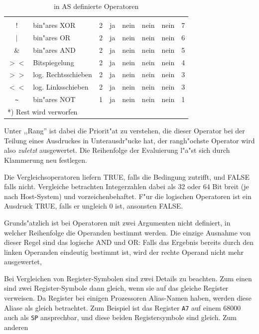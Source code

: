 \documentclass[12pt,a4paper,twoside]{report}
\newcommand{\ii}[1]{{\it #1}}
\newcommand{\asname}{AS}
\begin{document}
\begin{table}[htbp]
\begin{center}
\begin{tabular}{|c|l|c|c|c|c|c|c|}
            & & & & & &  \\
$!$         & bin"ares XOR         & 2 & ja   & nein & nein & nein & 7 \\
$|$         & bin"ares OR          & 2 & ja   & nein & nein & nein & 6 \\
\&          & bin"ares AND         & 2 & ja   & nein & nein & nein & 5 \\
$><$        & Bitspiegelung        & 2 & ja   & nein & nein & nein & 4 \\
$>>$        & log. Rechtsschieben  & 2 & ja   & nein & nein & nein & 3 \\
$<<$        & log. Linksschieben   & 2 & ja   & nein & nein & nein & 3 \\
\verb! ~ !  & bin"ares NOT         & 1 & ja   & nein & nein & nein & 1 \\
\hline
\multicolumn{8}{|l|}{*) Rest wird verworfen} \\
\hline
\end{tabular}\end{center}
\caption{in \asname{} definierte Operatoren\label{TabOps}}
\end{table}
Unter ,,Rang'' ist dabei die Priorit"at zu verstehen, die dieser Operator bei
der Teilung eines Ausdruckes in Unterausdr"ucke hat, der rangh"ochste
Operator wird also \ii{zuletzt} ausgewertet.  Die Reihenfolge der
Evaluierung l"a"st sich durch Klammerung neu festlegen.
\par
Die Vergleichsoperatoren liefern TRUE, falls die Bedingung zutrifft,
und FALSE falls nicht.  Vergleiche betrachten Integerzahlen dabei als
32 oder 64 Bit breit (je nach Host-System) und vorzeichenbehaftet. F"ur
die logischen Operatoren ist ein Ausdruck TRUE, falls er ungleich 0 ist,
ansonsten FALSE.
\par
Grunds"atzlich ist bei Operatoren mit zwei Argumenten nicht definiert, in
welcher Reihenfolge die Operanden bestimmt werden.  Die einzige Ausnahme
von dieser Regel sind das logische AND und OR: Falls das Ergebnis bereits
durch den linken Operanden eindeutig bestimmt ist, wird der rechte
Operand nicht mehr ausgewertet,
\par
Bei Vergleichen von Register-Symbolen sind zwei Details zu beachten.
Zum einen sind zwei Register-Symbole dann gleich, wenn sie auf das
gleiche Register verweisen.  Da Register bei einigen Prozessoren
Alias-Namen haben, werden diese Aliase als gleich betrachtet.  Zum
Beispiel ist das Register {\tt A7} auf einem 68000 auch als {\tt SP}
ansprechbar, und diese beiden Registersymbole sind gleich.  Zum anderen
\end{document}
